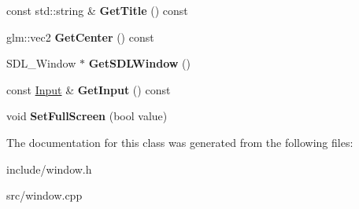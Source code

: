 \begin{DoxyCompactItemize}
\item 
\hypertarget{class_z_e_g_l_1_1_window_a0acad71a1f0532baadda1d84a6e063ca}{}const std\+::string \& {\bfseries Get\+Title} () const \label{class_z_e_g_l_1_1_window_a0acad71a1f0532baadda1d84a6e063ca}

\item 
\hypertarget{class_z_e_g_l_1_1_window_ab38a9c7f9d73195fc84ab0b04b2bfbad}{}glm\+::vec2 {\bfseries Get\+Center} () const \label{class_z_e_g_l_1_1_window_ab38a9c7f9d73195fc84ab0b04b2bfbad}

\item 
\hypertarget{class_z_e_g_l_1_1_window_ac563daa5dc6417b74601b05aa87fd5b8}{}S\+D\+L\+\_\+\+Window $\ast$ {\bfseries Get\+S\+D\+L\+Window} ()\label{class_z_e_g_l_1_1_window_ac563daa5dc6417b74601b05aa87fd5b8}

\item 
\hypertarget{class_z_e_g_l_1_1_window_a4484df799a60648fa9f4cf732a963bf0}{}const \hyperlink{class_z_e_g_l_1_1_input}{Input} \& {\bfseries Get\+Input} () const \label{class_z_e_g_l_1_1_window_a4484df799a60648fa9f4cf732a963bf0}

\item 
\hypertarget{class_z_e_g_l_1_1_window_a5aca5526280a2f95f42c732a407a6129}{}void {\bfseries Set\+Full\+Screen} (bool value)\label{class_z_e_g_l_1_1_window_a5aca5526280a2f95f42c732a407a6129}

\end{DoxyCompactItemize}


The documentation for this class was generated from the following files\+:\begin{DoxyCompactItemize}
\item 
include/window.\+h\item 
src/window.\+cpp\end{DoxyCompactItemize}
